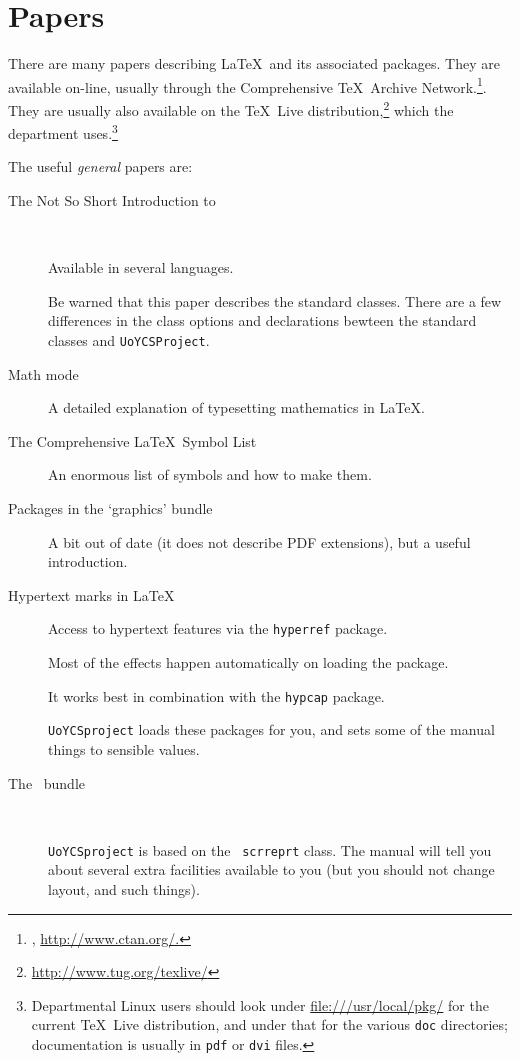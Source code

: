 \documentclass[authoryearcitations]{UoYCSproject}
\begin{document}
\section{Papers}
\label{sec:papers}

There are many papers describing \LaTeX\ and its associated packages.
They are available on-line, usually through the Comprehensive \TeX\ 
Archive Network.\footnote{\CTAN, \url{http://www.ctan.org/.}}.  They
are usually also available on the \TeX~Live
distribution,\footnote{\url{http://www.tug.org/texlive/}} which the
department uses.\footnote{Departmental Linux users should look under
  \url{file:///usr/local/pkg/} for the current \TeX~Live distribution,
  and under that for the various \lstinline|doc| directories;
  documentation is usually in \lstinline|pdf| or \lstinline|dvi|
  files.}

The useful \emph{general} papers are:
\begin{description}
\item[The Not So Short Introduction to \LaTeXe\ 
  \citep{OetikerPartlHynaSchlegl2002}]\
  
  Available in several languages.
  
  Be warned that this paper describes the standard classes.  There are
  a few differences in the class options and declarations bewteen the
  standard classes and \lstinline|UoYCSProject|.
\item[Math mode \citep{Voss2007}] A detailed explanation of
  typesetting mathematics in \LaTeX.
\item[The Comprehensive \LaTeX\ Symbol List \citep{Pakin2005}] An
  enormous list of symbols and how to make them.
\item[Packages in the `graphics' bundle \citep{Carlisle1999}] A bit
  out of date (it does not describe PDF extensions), but a useful
  introduction.
\item[Hypertext marks in \LaTeX\ \citep{RahtzOberdiek2003}] Access to
  hypertext features via the \lstinline|hyperref| package.

  Most of the effects happen automatically on loading the package.

  It works best in combination with the \lstinline{hypcap} package.

  \lstinline|UoYCSproject| loads these packages for you, and sets some
  of the manual things to sensible values.
\item[The \KOMAScript\ bundle \citep{KohmMorawski2003}]\

  \lstinline|UoYCSproject| is based on the \KOMAScript\ 
  \lstinline|scrreprt| class.  The manual will tell you about several
  extra facilities available to you (but you should not change layout,
  and such things).
\end{description}
\end{document}
